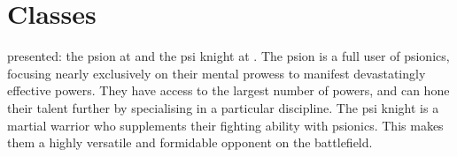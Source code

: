 \chapter{Classes}
\label{chap:classes}
presented: the psion at  and the psi knight at
.
The psion is a full user of psionics,
focusing nearly exclusively on their mental prowess
to manifest devastatingly effective powers.
They have access to the largest number of powers,
and can hone their talent further by specialising
in a particular discipline.
The psi knight is a martial warrior
who supplements their fighting ability with
psionics.
This makes them a highly versatile and formidable
opponent on the battlefield.


\clearpage